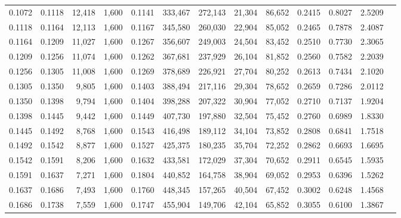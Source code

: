 \begin{tabular}{rrrrrrrrrrrrr}
0.1072 & 0.1118 & 12,418 & 1,600 &                                     0.1141 & 333,467 & 272,143 &  21,304 &  86,652 & 0.2415 & 0.8027 & 2.5209 \\
0.1118 & 0.1164 & 12,113 & 1,600 &                                     0.1167 & 345,580 & 260,030 &  22,904 &  85,052 & 0.2465 & 0.7878 & 2.4087 \\
0.1164 & 0.1209 & 11,027 & 1,600 &                                     0.1267 & 356,607 & 249,003 &  24,504 &  83,452 & 0.2510 & 0.7730 & 2.3065 \\
0.1209 & 0.1256 & 11,074 & 1,600 &                                     0.1262 & 367,681 & 237,929 &  26,104 &  81,852 & 0.2560 & 0.7582 & 2.2039 \\
0.1256 & 0.1305 & 11,008 & 1,600 &                                     0.1269 & 378,689 & 226,921 &  27,704 &  80,252 & 0.2613 & 0.7434 & 2.1020 \\
0.1305 & 0.1350 &  9,805 & 1,600 &                                     0.1403 & 388,494 & 217,116 &  29,304 &  78,652 & 0.2659 & 0.7286 & 2.0112 \\
0.1350 & 0.1398 &  9,794 & 1,600 &                                     0.1404 & 398,288 & 207,322 &  30,904 &  77,052 & 0.2710 & 0.7137 & 1.9204 \\
0.1398 & 0.1445 &  9,442 & 1,600 &                                     0.1449 & 407,730 & 197,880 &  32,504 &  75,452 & 0.2760 & 0.6989 & 1.8330 \\
0.1445 & 0.1492 &  8,768 & 1,600 &                                     0.1543 & 416,498 & 189,112 &  34,104 &  73,852 & 0.2808 & 0.6841 & 1.7518 \\
0.1492 & 0.1542 &  8,877 & 1,600 &                                     0.1527 & 425,375 & 180,235 &  35,704 &  72,252 & 0.2862 & 0.6693 & 1.6695 \\
0.1542 & 0.1591 &  8,206 & 1,600 &                                     0.1632 & 433,581 & 172,029 &  37,304 &  70,652 & 0.2911 & 0.6545 & 1.5935 \\
0.1591 & 0.1637 &  7,271 & 1,600 &                                     0.1804 & 440,852 & 164,758 &  38,904 &  69,052 & 0.2953 & 0.6396 & 1.5262 \\
0.1637 & 0.1686 &  7,493 & 1,600 &                                     0.1760 & 448,345 & 157,265 &  40,504 &  67,452 & 0.3002 & 0.6248 & 1.4568 \\
0.1686 & 0.1738 &  7,559 & 1,600 &                                     0.1747 & 455,904 & 149,706 &  42,104 &  65,852 & 0.3055 & 0.6100 & 1.3867 \\

\end{tabular}
